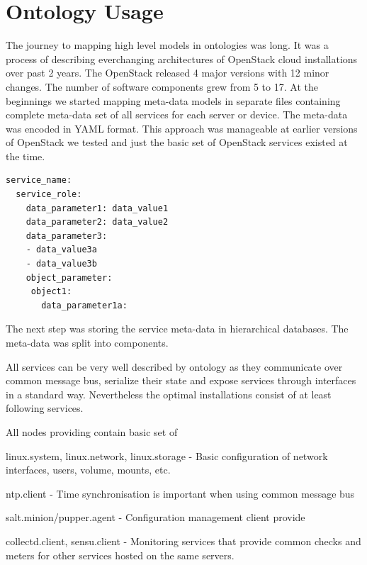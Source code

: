 
\section{Ontology Usage}
\label{chap:usage}


The journey to mapping high level models in ontologies was long. It was a process of describing everchanging architectures of OpenStack cloud installations over past 2 years. The OpenStack released 4 major versions with 12 minor changes. The number of software components grew from 5 to 17. At the beginnings we started mapping meta-data models in separate files containing complete meta-data set of all services for each server or device. The meta-data was encoded in YAML format. This approach was manageable at earlier versions of OpenStack we tested and just the basic set of OpenStack services existed at the time. 

\begin{lstlisting}
service_name:
  service_role:
    data_parameter1: data_value1
    data_parameter2: data_value2
    data_parameter3:
    - data_value3a
    - data_value3b    
    object_parameter:
     object1:
       data_parameter1a: 
\end{lstlisting}


The next step was storing the service meta-data in hierarchical databases. The meta-data was split into components. 


All services  can be very well described by ontology as they communicate over common message bus, serialize their state and expose services through interfaces in a standard way. Nevertheless the optimal installations consist of at least following services.

All nodes providing contain basic set of

linux.system, linux.network, linux.storage - Basic configuration of network interfaces, users, volume, mounts, etc.

ntp.client - Time synchronisation is important when using common message bus

salt.minion/pupper.agent - Configuration management client provide

collectd.client, sensu.client - Monitoring services that provide common checks and meters for other services hosted on the same servers.

